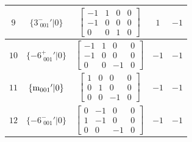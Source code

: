 \documentclass[fleqn,8pt]{jsarticle}
\begin{document}
\begin{longtable}{ccccc}
$ 9 $ & $ \{3^{-}_{\,\,001}{}'|0\} $ & $ \begin{bmatrix} -1 & 1 & 0 & 0 \\ -1 & 0 & 0 & 0 \\ 0 & 0 & 1 & 0 \end{bmatrix} $ & $ 1 $ & $ -1 $ \\ \hline
$ 10 $ & $ \{-6^{+}_{\,\,001}{}'|0\} $ & $ \begin{bmatrix} -1 & 1 & 0 & 0 \\ -1 & 0 & 0 & 0 \\ 0 & 0 & -1 & 0 \end{bmatrix} $ & $ -1 $ & $ -1 $ \\ \hline
$ 11 $ & $ \{{\rm m}_{001}{}'|0\} $ & $ \begin{bmatrix} 1 & 0 & 0 & 0 \\ 0 & 1 & 0 & 0 \\ 0 & 0 & -1 & 0 \end{bmatrix} $ & $ -1 $ & $ -1 $ \\ \hline
$ 12 $ & $ \{-6^{-}_{\,\,001}{}'|0\} $ & $ \begin{bmatrix} 0 & -1 & 0 & 0 \\ 1 & -1 & 0 & 0 \\ 0 & 0 & -1 & 0 \end{bmatrix} $ & $ -1 $ & $ -1 $ \\
\end{longtable}
\end{document}
